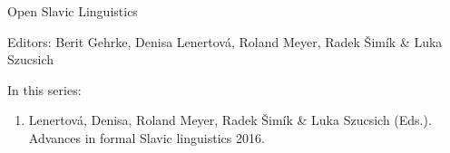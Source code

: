 {\large Open Slavic Linguistics}

\bigskip

Editors: Berit Gehrke,
         Denisa Lenertová, 
         Roland Meyer, 
         Radek Šimík \&  
         Luka Szucsich

\bigskip

In this series:

\begin{enumerate}
\item Lenertová, Denisa, Roland Meyer, Radek Šimík \& Luka Szucsich (Eds.). Advances in formal Slavic linguistics 2016.
\end{enumerate}
